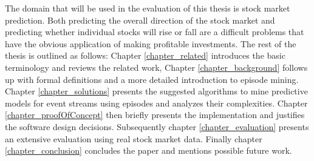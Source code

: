 The domain that will be used in the evaluation of this thesis is stock market prediction. Both predicting the overall direction of the stock market and predicting whether individual stocks will rise or fall are a difficult problems that have the obvious application of making profitable investments. \newline
The rest of the thesis is outlined as follows: Chapter \ref{chapter_related} introduces the basic terminology and reviews the related work, Chapter \ref{chapter_background} follows up with formal definitions and a more detailed introduction to episode mining. Chapter \ref{chapter_solutions} presents the suggested algorithms to mine predictive models for event streams using episodes and analyzes their complexities. Chapter \ref{chapter_proofOfConcept} then briefly presents the implementation and justifies the software design decisions. Subsequently chapter \ref{chapter_evaluation} presents an extensive evaluation using real stock market data. Finally chapter \ref{chapter_conclusion} concludes the paper and mentions possible future work.



